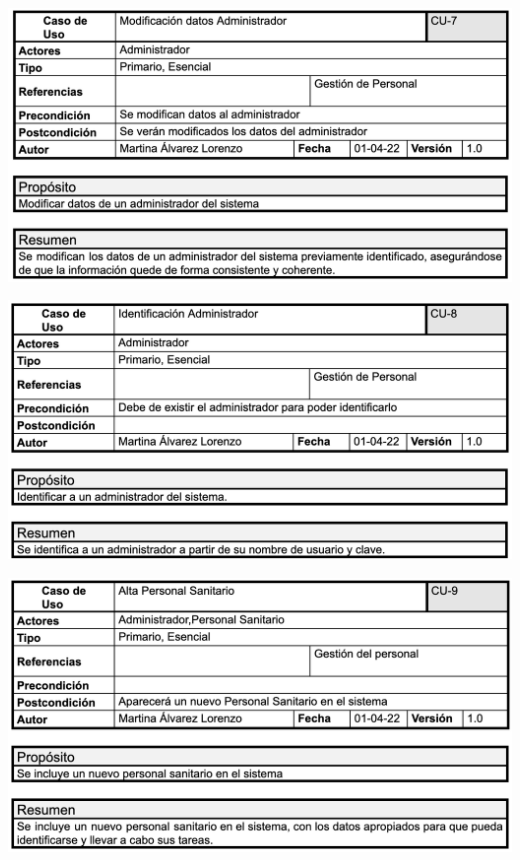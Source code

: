 \documentclass[12pt, spanish]{article}
\begin{document}
\begin{centering}\includegraphics[scale = 0.70]{casos_de_uso/7.png}\\[1.0 cm]\end{centering}
\begin{centering}\includegraphics[scale = 0.70]{casos_de_uso/8.png}\\[1.0 cm]\end{centering}
\begin{centering}\includegraphics[scale = 0.70]{casos_de_uso/9.png}\\[1.0 cm]\end{centering}
\end{document}
